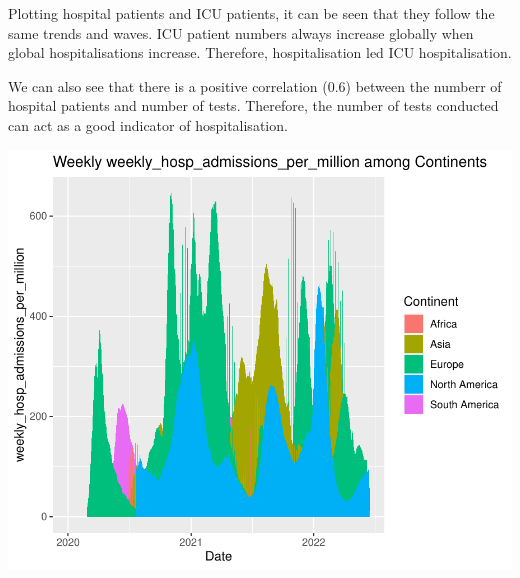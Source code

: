 \documentclass[11pt,preprint, authoryear]{elsarticle}
\numberwithin{equation}{section}
\numberwithin{figure}{section}
\numberwithin{table}{section}
\begin{document}
Plotting hospital patients and ICU patients, it can be seen that they
follow the same trends and waves. ICU patient numbers always increase
globally when global hospitalisations increase. Therefore,
hospitalisation led ICU hospitalisation.

We can also see that there is a positive correlation (0.6) between the
numberr of hospital patients and number of tests. Therefore, the number
of tests conducted can act as a good indicator of hospitalisation.

\includegraphics{Q1_files/figure-latex/unnamed-chunk-2-1.pdf}
\end{document}
